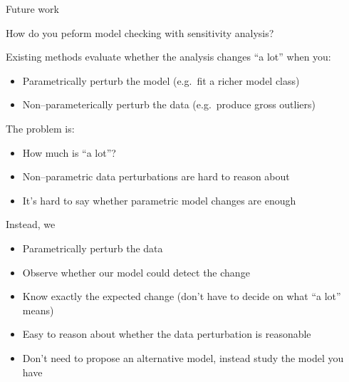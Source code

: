 
\begin{frame}{Future work}

How do you peform model checking with sensitivity analysis?

Existing methods evaluate whether the analysis changes ``a lot'' when you:
%
\begin{itemize}
\item Parametrically perturb the model (e.g.~fit a richer model class)
\item Non--parameterically perturb the data (e.g.~produce gross outliers)
\end{itemize}
%
The problem is:
%
\begin{itemize}
\item How much is ``a lot''?
\item Non--parametric data perturbations are hard to reason about
\item It's hard to say whether parametric model changes are enough
\end{itemize}
%


Instead, we
%
\begin{itemize}
\item Parametrically perturb the data
\item Observe whether our model could detect the change
\end{itemize}
%
\begin{itemize}
\item Know exactly the expected change (don't have to decide on what ``a lot'' means)
\item Easy to reason about whether the data perturbation is reasonable
\item Don't need to propose an alternative model, instead study the model you have
\end{itemize}


\end{frame}





